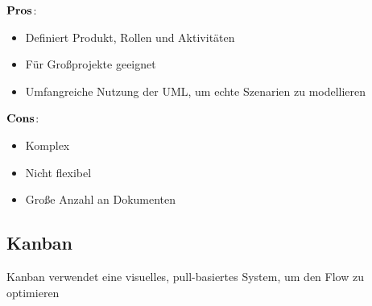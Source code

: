 \begin{multicols}{2}
$\bold{Pros}$:
\begin{itemize}
	\item Definiert Produkt, Rollen und Aktivitäten
	\item Für Großprojekte geeignet
	\item Umfangreiche Nutzung der UML, um echte Szenarien zu modellieren
\end{itemize}	
\columnbreak
$\bold{Cons}$:
\begin{itemize}
	\item Komplex
	\item Nicht flexibel
	\item Große Anzahl an Dokumenten
\end{itemize}
\end{multicols}
\subsection{Kanban}
Kanban verwendet eine visuelles, pull-basiertes System, um den Flow zu optimieren
